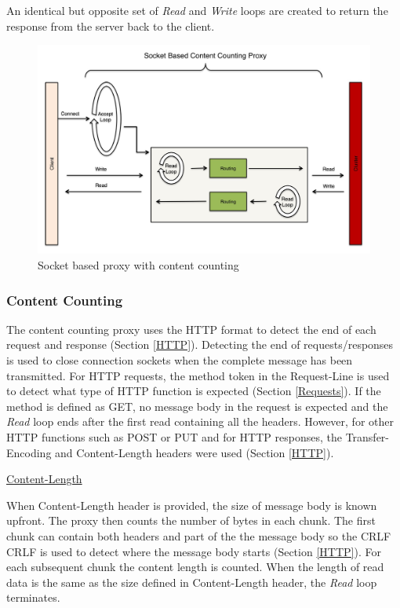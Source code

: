 \documentclass[a4paper,11pt,twoside]{report}
\begin{document}
An identical but opposite set of \textit{Read} and \textit{Write} loops are created to return the response from the server back to the client.

\begin{figure}[!ht]
  \centering
     \includegraphics[scale=0.31]{content_counting_proxy}
  \caption{Socket based proxy with content counting}
  \label{content_counting_proxy}
\end{figure}

\subsubsection*{Content Counting}
The content counting proxy uses the HTTP format to detect the end of each request and response (Section \ref{HTTP}). Detecting the end of requests/responses is used to close connection sockets when the complete message has been transmitted.   For HTTP requests, the method token in the Request-Line is used to detect what type of HTTP function is expected (Section \ref{Requests}). If the method is defined as GET, no message body in the request is expected and the \textit{Read} loop ends after the first read containing all the headers. However, for other HTTP functions such as POST or PUT and for HTTP responses, the Transfer-Encoding and Content-Length headers were used (Section \ref{HTTP}).\medskip 

\noindent
\underline{Content-Length}\medskip

\noindent
When Content-Length header is provided, the size of message body is known upfront.  The proxy then counts the number of bytes in each chunk.  The first chunk can contain both headers and part of the the message body so the CRLF CRLF is used to detect where the message body starts (Section \ref{HTTP}). For each subsequent chunk the content length is counted. When the length of read data is the same as the size defined in Content-Length header, the \textit{Read} loop terminates.\medskip 
\end{document}

